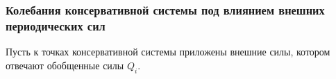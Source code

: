 \subsubsection*{Колебания консервативной системы под влиянием
внешних периодических сил}

Пусть к точках консервативной системы приложены внешние силы, котором отвечают обобщенные силы $Q_i$.